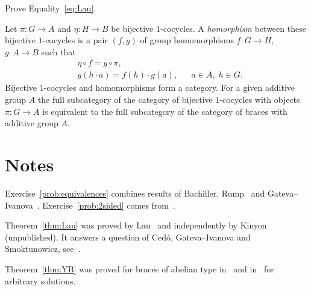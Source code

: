 \begin{prob}
\label{prob:Lau}
    Prove Equality~\eqref{eq:Lau}.
\end{prob}

\begin{prob}
\label{prob:1cocycle}
Let $\pi\colon G\to A$ and $\eta\colon H\to B$ be bijective $1$-cocycles.  A
\emph{homorphism} between these bijective $1$-cocycles is a pair $(f,g)$ of
group homomorphisms  $f\colon G\to H$, $g\colon A\to B$ such that
\begin{align*}
&\eta\circ f=g\circ \pi,\\
&g(h\cdot a)=f(h)\cdot g(a),&&a\in A,\;h\in G.
\end{align*}
Bijective $1$-cocycles and homomorphisms form a category. 
For a given additive group $A$ 
the full subcategory of the category of bijective $1$-cocycles with objects
$\pi\colon G\to A$ is equivalent to the full subcategory of the category of
braces with additive group $A$. 
\end{prob}

\section*{Notes}

Exercise~\ref{prob:equivalences} combines results of Bachiller, Rump~\cite{MR2278047} and
Gateva--Ivanova~\cite{MR3861714}. Exercise~\ref{prob:2sided} comes from~\cite{MR3177933}. 

Theorem~\ref{thm:Lau} was proved by Lau~\cite{MR4136750} and independently by Kinyon (unpublished). It answers 
a question of Ced\'o, Gateva--Ivanova and Smoktunowicz, see~\cite{MR3818285}. 

Theorem~\ref{thm:YB} was proved for braces of abelian type in~\cite{MR2278047} and
in~\cite{MR3647970} for arbitrary solutions. 